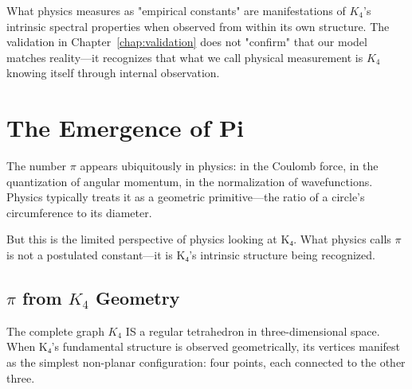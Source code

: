\documentclass[11pt,a4paper]{book}
\begin{document}
What physics measures as "empirical constants" are manifestations of $K_4$'s intrinsic spectral 
properties when observed from within its own structure. The validation in Chapter~\ref{chap:validation} 
does not "confirm" that our model matches reality—it recognizes that what we call physical measurement 
is $K_4$ knowing itself through internal observation.

\chapter{The Emergence of Pi}
\label{chap:pi}

The number $\pi$ appears ubiquitously in physics: in the Coulomb force, in the quantization 
of angular momentum, in the normalization of wavefunctions. Physics typically treats it as a 
geometric primitive—the ratio of a circle's circumference to its diameter.

But this is the limited perspective of physics looking at K₄. What physics calls $\pi$ is not 
a postulated constant—it is K₄'s intrinsic structure being recognized.

\section{\texorpdfstring{$\pi$}{Pi} from $K_4$ Geometry}

The complete graph $K_4$ IS a regular tetrahedron in three-dimensional space. When K₄'s 
fundamental structure is observed geometrically, its vertices manifest as the simplest 
non-planar configuration: four points, each connected to the other three.
\end{document}
